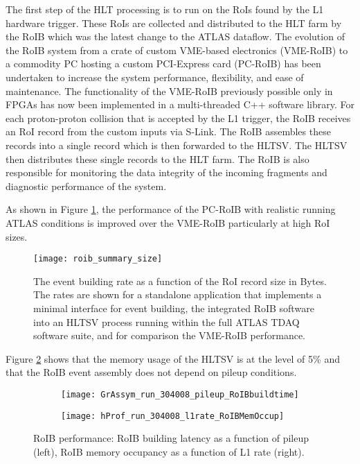 The first step of the HLT processing is to run on the RoIs found by the L1 hardware trigger. These
RoIs are collected and distributed to the HLT farm by the RoIB \cite{1748-0221-11-02-C02080} which was the 
latest change to the ATLAS dataflow. 
The
evolution of the RoIB system from a crate of custom VME-based electronics (VME-RoIB) to a commodity
PC hosting a custom PCI-Express card (PC-RoIB) has been undertaken to increase the system performance,
flexibility, and ease of maintenance. The functionality of the VME-RoIB previously possible only in FPGAs has
now been implemented in a multi-threaded C++ software library. 
For each proton-proton collision that is accepted by the L1 trigger, the
RoIB receives an RoI record from the custom inputs via S-Link. The RoIB assembles these records into
a single record which is then forwarded to the HLTSV. The HLTSV then
distributes these single records to the HLT farm. The RoIB is also responsible for monitoring the
data integrity of the incoming fragments and diagnostic performance of the system.

As shown in Figure \ref{fig:roib_summary}, the performance of the PC-RoIB with realistic running ATLAS conditions
is improved over the VME-RoIB particularly at high RoI sizes. 

\begin{figure}[t!]
\centering
\texttt{[image: roib\_summary\_size]} 
\caption{The event building rate as a function of the RoI record size in Bytes. The rates are shown for a standalone application that implements 
a minimal interface for event building, the integrated RoIB software into an HLTSV process
running within the full ATLAS TDAQ software suite, and for comparison the VME-RoIB performance.}
\label{fig:roib_summary}
\end{figure} 

Figure \ref{fig:roib_pileup_l1rate} shows that the memory usage of the HLTSV is at the level of 5\% and that the RoIB event assembly does not depend 
on pileup conditions.


\begin{figure}[t!]
\centering
\begin{subfigure}[t]{0.48\textwidth}
\texttt{[image: GrAssym\_run\_304008\_pileup\_RoIBbuildtime]}
\end{subfigure}
\begin{subfigure}[t]{0.48\textwidth}
\texttt{[image: hProf\_run\_304008\_l1rate\_RoIBMemOccup]}
\end{subfigure}
\vspace{-0.25cm}
\caption{RoIB performance: RoIB building latency as a function of pileup (left), RoIB memory occupancy as a function of L1 rate (right).}
\label{fig:roib_pileup_l1rate}
\end{figure} 


